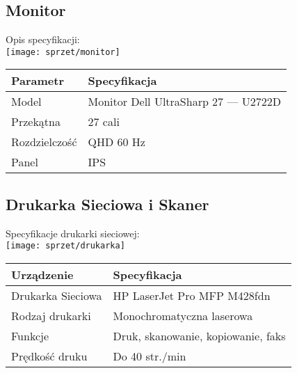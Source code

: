 \subsection{Monitor}

    Opis specyfikacji:\\
    \texttt{[image: sprzet/monitor]}

    \begin{flushleft}
        \begin{table}[h]
            \renewcommand{\arraystretch}{1.5}
            \begin{tabular}{|l|l|}
            \hline
                \textbf{Parametr} & \textbf{Specyfikacja} \\
            \hline
                Model & Monitor Dell UltraSharp 27 — U2722D            \\
                Przekątna & 27 cali \\
                Rozdzielczość & QHD 60 Hz \\
                Panel & IPS \\
            \hline
            \end{tabular}
        \end{table}  
    \end{flushleft}

\subsection{Drukarka Sieciowa i Skaner}

    Specyfikacje drukarki sieciowej:\\
    \texttt{[image: sprzet/drukarka]}

    \begin{flushleft}
        \begin{table}[h]
            \renewcommand{\arraystretch}{1.5}
            \begin{tabular}{|l|l|}
            \hline
            \textbf{Urządzenie} & \textbf{Specyfikacja} \\
            \hline
                Drukarka Sieciowa & HP LaserJet Pro MFP M428fdn \\
                Rodzaj drukarki & Monochromatyczna laserowa \\
                Funkcje & Druk, skanowanie, kopiowanie, faks \\
                Prędkość druku & Do 40 str./min \\
            \hline
            \end{tabular}
        \end{table}
    
    \end{flushleft}

